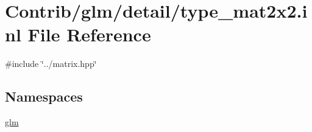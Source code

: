 \hypertarget{type__mat2x2_8inl}{}\section{Contrib/glm/detail/type\+\_\+mat2x2.inl File Reference}
\label{type__mat2x2_8inl}
{\ttfamily \#include \char`\"{}../matrix.\+hpp\char`\"{}}\newline
\subsection*{Namespaces}
\begin{DoxyCompactItemize}
\item 
 \mbox{\hyperlink{namespaceglm}{glm}}
\end{DoxyCompactItemize}

